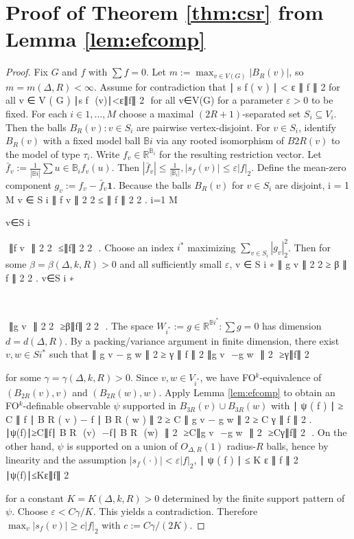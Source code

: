 \documentclass{article}
\begin{document}
\section*{Proof of Theorem \ref{thm:csr} from Lemma \ref{lem:efcomp}}
\begin{proof}
Fix $G$ and $f$ with $\sum f=0$.
Let $m:=\max_{v\in V(G)} |B_R(v)|$, so $m=m(\Delta,R)<\infty$.
Assume for contradiction that
∣
s
f
(
v
)
∣
<
ε
∥
f
∥
2
for all 
v
∈
V
(
G
)
∣s 
f
​	
 (v)∣<ε∥f∥ 
2
​	
 for all v∈V(G)
for a parameter $\varepsilon>0$ to be fixed.
For each $i\in{1,\dots,M}$ choose a maximal $(2R+1)$-separated set $S_i\subseteq V_i$.
Then the balls ${B_R(v): v\in S_i}$ are pairwise vertex-disjoint.
For $v\in S_i$, identify $B_R(v)$ with a fixed model ball $\mathbb{B}i$ via any rooted isomorphism of $B{2R}(v)$ to the model of type $\tau_i$.
Write $f_v\in\mathbb{R}^{\mathbb{B}_i}$ for the resulting restriction vector.
Let $\bar f_v := \frac{1}{|\mathbb{B}i|}\sum{u\in \mathbb{B}_i} f_v(u)$.
Then $|\bar f_v| \le \frac{1}{|\mathbb{B}_i|},|s_f(v)| \le \varepsilon |f|_2$.
Define the mean-zero component $g_v:=f_v-\bar f_v \mathbf{1}$.
Because the balls $B_R(v)$ for $v\in S_i$ are disjoint,
\sum
i
=
1
M
\sum
v
∈
S
i
∥
f
v
∥
2
2
≤
∥
f
∥
2
2
.
i=1
\sum
M
​	
  
v∈S 
i
​	
 
\sum
​	
 ∥f 
v
​	
 ∥ 
2
2
​	
 ≤∥f∥ 
2
2
​	
 .
Choose an index $i^\ast$ maximizing $\sum_{v\in S_{i}} |g_v|_2^2$.
Then for some $\beta=\beta(\Delta,k,R)>0$ and all sufficiently small $\varepsilon$,
\sum
v
∈
S
i
∗
∥
g
v
∥
2
2
≥
β
∥
f
∥
2
2
.
v∈S 
i 
∗
 
​	
 
\sum
​	
 ∥g 
v
​	
 ∥ 
2
2
​	
 ≥β∥f∥ 
2
2
​	
 .
The space $W_{i^\ast}:={g\in\mathbb{R}^{\mathbb{B}{i^\ast}}:\sum g=0}$ has dimension $d=d(\Delta,R)$.
By a packing/variance argument in finite dimension, there exist $v,w\in S{i^\ast}$ such that
∥
g
v
−
g
w
∥
2
≥
γ
∥
f
∥
2
∥g 
v
​	
 −g 
w
​	
 ∥ 
2
​	
 ≥γ∥f∥ 
2
​	
 
for some $\gamma=\gamma(\Delta,k,R)>0$.
Since $v,w\in V_{i^\ast}$, we have FO$^k$-equivalence of $(B_{2R}(v),v)$ and $(B_{2R}(w),w)$.
Apply Lemma \ref{lem:efcomp} to obtain an FO$^k$-definable observable $\psi$ supported in $B_{3R}(v)\cup B_{3R}(w)$ with
∣
ψ
(
f
)
∣
≥
C
∥
f
∣
B
R
(
v
)
−
f
∣
B
R
(
w
)
∥
2
≥
C
∥
g
v
−
g
w
∥
2
≥
C
γ
∥
f
∥
2
.
∣ψ(f)∣≥C∥f∣ 
B 
R
​	
 (v)
​	
 −f∣ 
B 
R
​	
 (w)
​	
 ∥ 
2
​	
 ≥C∥g 
v
​	
 −g 
w
​	
 ∥ 
2
​	
 ≥Cγ∥f∥ 
2
​	
 .
On the other hand, $\psi$ is supported on a union of $O_{\Delta,R}(1)$ radius-$R$ balls, hence by linearity and the assumption $|s_f(\cdot)|<\varepsilon|f|_2$,
∣
ψ
(
f
)
∣
≤
K
ε
∥
f
∥
2
∣ψ(f)∣≤Kε∥f∥ 
2
​	
 
for a constant $K=K(\Delta,k,R)>0$ determined by the finite support pattern of $\psi$.
Choose $\varepsilon< C\gamma/K$. This yields a contradiction.
Therefore $\max_v |s_f(v)| \ge c|f|_2$ with $c:=C\gamma/(2K)$.
\end{proof}
\end{document}
